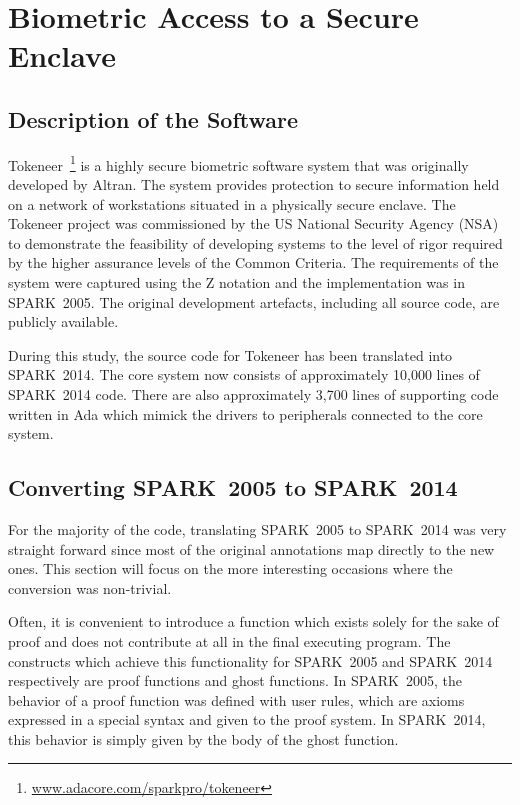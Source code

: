 \documentclass[10pt,a4paper,twocolumn]{article}
\newcommand{\oldspark}{SPARK~2005\xspace}
\newcommand{\newspark}{SPARK~2014\xspace}
\begin{document}
\section{Biometric Access to a Secure Enclave}


\subsection{Description of the Software}

Tokeneer~\footnote{\url{www.adacore.com/sparkpro/tokeneer}} is a highly secure
biometric software system that was originally developed by Altran. The system
provides protection to secure information held on a network of workstations
situated in a physically secure enclave. The Tokeneer project was commissioned
by the US National Security Agency (NSA) to demonstrate the feasibility of
developing systems to the level of rigor required by the higher assurance
levels of the Common Criteria. The requirements of the system were captured
using the Z notation and the implementation was in \oldspark. The original
development artefacts, including all source code, are publicly available.

During this study, the source code for Tokeneer has been translated
into \newspark. The core system now consists of approximately 10,000
lines of \newspark code. There are also approximately 3,700 lines of
supporting code written in Ada which mimick the drivers to
peripherals connected to the core system.

\subsection{Converting \oldspark to \newspark}

For the majority of the code, translating \oldspark to \newspark was
very straight forward since most of the original annotations map
directly to the new ones. This section will focus on the more
interesting occasions where the conversion was non-trivial.

Often, it is convenient to introduce a function which exists
solely for the sake of proof and does not contribute at all in
the final executing program. The constructs which achieve this
functionality for \oldspark and \newspark respectively are proof
functions and ghost functions. In \oldspark, the behavior of a proof
function was defined with user rules, which are axioms expressed in a special
syntax and given to the proof system. In \newspark, this
behavior is simply given by the body of the ghost function.
\end{document}

